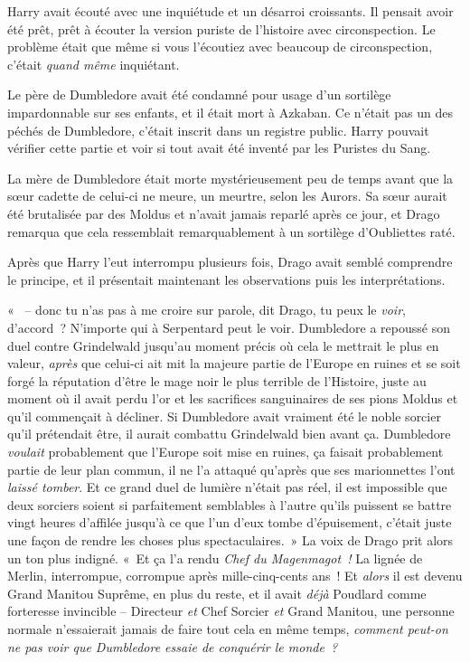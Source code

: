 \later

Harry avait écouté avec une inquiétude et un désarroi croissants. Il pensait avoir été prêt, prêt à écouter la version puriste de l'histoire avec circonspection. Le problème était que même si vous l'écoutiez avec beaucoup de circonspection, c'était \emph{quand même} inquiétant.

Le père de Dumbledore avait été condamné pour usage d'un sortilège impardonnable sur ses enfants, et il était mort à Azkaban. Ce n'était pas un des péchés de Dumbledore, c'était inscrit dans un registre public. Harry pouvait vérifier cette partie et voir si tout avait été inventé par les Puristes du Sang.

La mère de Dumbledore était morte mystérieusement peu de temps avant que la sœur cadette de celui-ci ne meure, un meurtre, selon les Aurors. Sa sœur aurait été brutalisée par des Moldus et n'avait jamais reparlé après ce jour, et Drago remarqua que cela ressemblait remarquablement à un sortilège d'Oubliettes raté.

Après que Harry l'eut interrompu plusieurs fois, Drago avait semblé comprendre le principe, et il présentait maintenant les observations puis les interprétations.

«~ -- donc tu n'as pas à me croire sur parole, dit Drago, tu peux le \emph{voir}, d'accord~? N'importe qui à Serpentard peut le voir. Dumbledore a repoussé son duel contre Grindelwald jusqu'au moment précis où cela le mettrait le plus en valeur, \emph{après} que celui-ci ait mit la majeure partie de l'Europe en ruines et se soit forgé la réputation d'être le mage noir le plus terrible de l'Histoire, juste au moment où il avait perdu l'or et les sacrifices sanguinaires de ses pions Moldus et qu'il commençait à décliner. Si Dumbledore avait vraiment été le noble sorcier qu'il prétendait être, il aurait combattu Grindelwald bien avant ça. Dumbledore \emph{voulait} probablement que l'Europe soit mise en ruines, ça faisait probablement partie de leur plan commun, il ne l'a attaqué qu'après que ses marionnettes l'ont \emph{laissé tomber}. Et ce grand duel de lumière n'était pas réel, il est impossible que deux sorciers soient si parfaitement semblables à l'autre qu'ils puissent se battre vingt heures d'affilée jusqu'à ce que l'un d'eux tombe d'épuisement, c'était juste une façon de rendre les choses plus spectaculaires.~» La voix de Drago prit alors un ton plus indigné. «~Et ça l'a rendu \emph{Chef du Magenmagot~!} La lignée de Merlin, interrompue, corrompue après mille-cinq-cents ans~! Et \emph{alors} il est devenu Grand Manitou Suprême, en plus du reste, et il avait \emph{déjà} Poudlard comme forteresse invincible -- Directeur \emph{et} Chef Sorcier \emph{et} Grand Manitou, une personne normale n'essaierait jamais de faire tout cela en même temps, \emph{comment peut-on ne pas voir que Dumbledore essaie de conquérir le monde~?}

